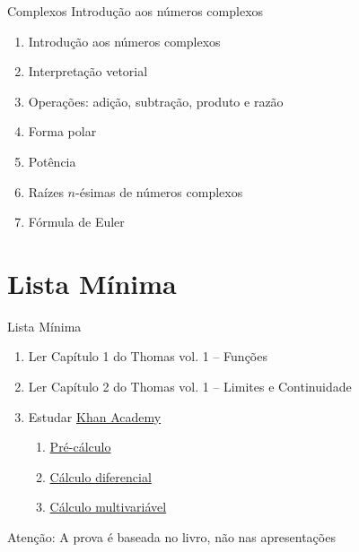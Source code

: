 \begin{frame}{Complexos}
  Introdução aos números complexos
  \begin{enumerate}[<+->]
    \item Introdução aos números complexos
    \item Interpretação vetorial
    \item Operações: adição, subtração, produto e razão
    \item Forma polar
    \item Potência
    \item Raízes $n$-ésimas de números complexos
    \item Fórmula de Euler
  \end{enumerate}
\end{frame}

\section{Lista Mínima}

\begin{frame}{Lista Mínima}
  \begin{enumerate}
    \item Ler Capítulo 1 do Thomas vol. 1 -- Funções
    \item Ler Capítulo 2 do Thomas vol. 1 -- Limites e Continuidade
    \item Estudar \href{https://pt.khanacademy.org}{Khan Academy}
    \begin{enumerate}
      \item \href{https://pt.khanacademy.org/math/precalculus}{Pré-cálculo}
      \item \href{https://pt.khanacademy.org/math/differential-calculus}{Cálculo diferencial}
      \item \href{https://pt.khanacademy.org/math/multivariable-calculus}{Cálculo multivariável}
    \end{enumerate}
  \end{enumerate}

  \vfill
  Atenção: A prova é baseada no livro, não nas apresentações
\end{frame}


